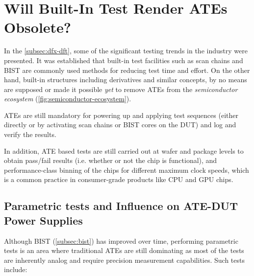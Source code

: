 

\section{Will Built-In Test Render \acp{ATE} Obsolete?}
\label{sec:bist-vs-ate}

In the \autoref{subsec:dfx-dft}, some of the significant testing trends
in the industry were presented.
It was established that built-in test facilities such as scan chains and
\ac{BIST} are commonly used methods for reducing test time and effort.
On the other hand, built-in structures including derivatives and similar
concepts, by no means are supposed or made it possible \emph{yet} to
remove \acp{ATE} from
the \emph{semiconductor ecosystem} (\autoref{fig:semiconductor-ecosystem}).

\acp{ATE} are still mandatory for powering up and applying test sequences
(either directly or by activating scan chains or \ac{BIST} cores
on the \ac{DUT}) and log and verify the results.

In addition, \ac{ATE} based tests are still carried out at wafer
and package levels to obtain pass/fail results (i.e. whether or not the chip is
functional), and performance-class binning of the chips for different maximum
clock speeds, which is a common practice in
consumer-grade products like \ac{CPU} and  \ac{GPU} chips.

\subsection{Parametric tests and Influence on ATE-DUT Power Supplies}

Although \ac{BIST} (\autoref{subsec:bist}) has improved
over time,
performing parametric tests is an area where traditional \acp{ATE} are still
dominating as most of the tests are inherently analog and
require precision measurement capabilities. Such tests include:

